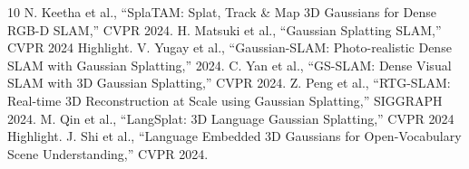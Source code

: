 \documentclass[10pt,twocolumn]{article}
\begin{document}
\begin{thebibliography}{10}
 N. Keetha et al., ``SplaTAM: Splat, Track \& Map 3D Gaussians for Dense RGB-D SLAM,'' CVPR 2024.
 H. Matsuki et al., ``Gaussian Splatting SLAM,'' CVPR 2024 Highlight.
 V. Yugay et al., ``Gaussian-SLAM: Photo-realistic Dense SLAM with Gaussian Splatting,'' 2024.
 C. Yan et al., ``GS-SLAM: Dense Visual SLAM with 3D Gaussian Splatting,'' CVPR 2024.
 Z. Peng et al., ``RTG-SLAM: Real-time 3D Reconstruction at Scale using Gaussian Splatting,'' SIGGRAPH 2024.
 M. Qin et al., ``LangSplat: 3D Language Gaussian Splatting,'' CVPR 2024 Highlight.
 J. Shi et al., ``Language Embedded 3D Gaussians for Open-Vocabulary Scene Understanding,'' CVPR 2024.
\end{thebibliography}
\end{document}

